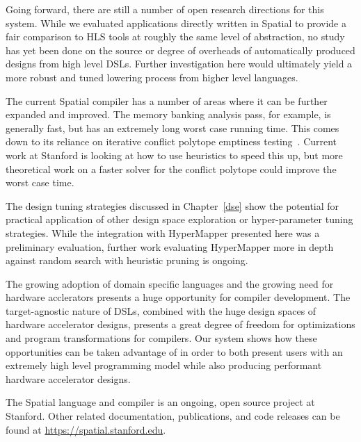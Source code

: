 Going forward, there are still a number of open research directions for this system.
While we evaluated applications directly written in Spatial to provide a fair
comparison to HLS tools at roughly the same level of abstraction, no study has yet
been done on the source or degree of overheads of automatically produced designs
from high level DSLs. Further investigation here would ultimately yield a more robust
and tuned lowering process from higher level languages.

The current Spatial compiler has a number of areas where it can be further expanded and
improved. The memory banking analysis pass, for example, is generally fast, but has
an extremely long worst case running time. This comes down to its reliance on
iterative conflict polytope emptiness testing~\cite{Wang_banking}. Current work
at Stanford is looking at how to use heuristics to speed this up, but more theoretical
work on a faster solver for the conflict polytope could improve the worst case time.

The design tuning strategies discussed in Chapter~\ref{dse} show the potential for
practical application of other design space exploration or hyper-parameter tuning
strategies. While the integration with HyperMapper presented here was a preliminary
evaluation, further work evaluating HyperMapper more in depth against random search
with heuristic pruning is ongoing.

The growing adoption of domain specific languages and the growing need for hardware
acclerators presents a huge opportunity for compiler development. The target-agnostic
nature of DSLs, combined with the huge design spaces of hardware accelerator designs,
presents a great degree of freedom for optimizations and program transformations
for compilers. Our system shows how these opportunities can be taken advantage of
in order to both present users with an extremely high level programming model while
also producing performant hardware accelerator designs. 

The Spatial language and compiler is an ongoing, open source project at Stanford.
Other related documentation, publications, and code releases can be found
at \url{https://spatial.stanford.edu}.
